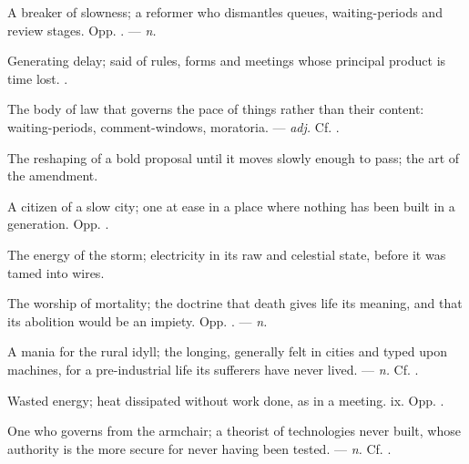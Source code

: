  A breaker of slowness; a reformer who dismantles queues, waiting-periods and review stages. Opp. . ---  \textit{n.}

 Generating delay; said of rules, forms and meetings whose principal product is time lost. .

 The body of law that governs the pace of things rather than their content: waiting-periods, comment-windows, moratoria. ---  \textit{adj.} Cf. .

 The reshaping of a bold proposal until it moves slowly enough to pass; the art of the amendment.  

 A citizen of a slow city; one at ease in a place where nothing has been built in a generation. Opp. .

 The energy of the storm; electricity in its raw and celestial state, before it was tamed into wires.  

 The worship of mortality; the doctrine that death gives life its meaning, and that its abolition would be an impiety. Opp. . ---  \textit{n.}

 A mania for the rural idyll; the longing, generally felt in cities and typed upon machines, for a pre-industrial life its sufferers have never lived. ---  \textit{n.} Cf. .

 Wasted energy; heat dissipated without work done, as in a meeting.   ix. Opp. .

 One who governs from the armchair; a theorist of technologies never built, whose authority is the more secure for never having been tested. ---  \textit{n.} Cf. .

